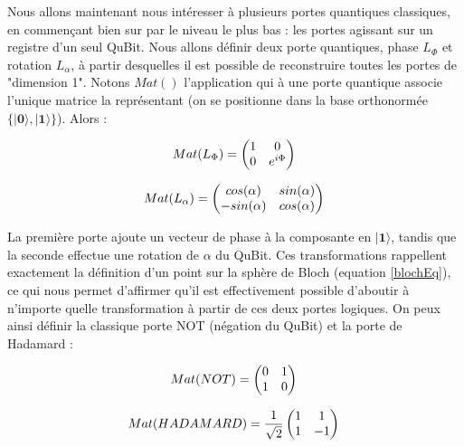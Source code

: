 \documentclass[a4paper,12pt]{report}
\newcommand{\quSt}[1]{\bm{|#1\rangle}}
\begin{document}
\par{
	Nous allons maintenant nous intéresser à plusieurs portes quantiques classiques, en commençant bien sur par le niveau le plus bas : les portes agissant sur un registre d'un seul QuBit. Nous allons définir deux porte quantiques, phase $L_{\Phi}$ et rotation $L_{\alpha}$, à partir desquelles il est possible de reconstruire toutes les portes de "dimension 1". Notons $Mat()$ l'application qui à une porte quantique associe l'unique matrice la représentant (on se positionne dans la base orthonormée $\{ \quSt{0}, \quSt{1} \}$). Alors :
}

\begin{equation}
	 Mat(L_{\Phi}) = \left( \begin{matrix} 1 & 0 \\ 0 & e^{i\Phi} \end{matrix} \right ) \\
\end{equation}

\begin{equation}
	 Mat(L_{\alpha}) = \left( \begin{matrix} cos(\alpha) & sin(\alpha) \\ -sin(\alpha) & cos(\alpha) \end{matrix} \right ) \\
\end{equation}

\vspace{1\baselineskip}

\par{
	La première porte ajoute un vecteur de phase à la composante en $\quSt{1}$, tandis que la seconde effectue une rotation de $\alpha$ du QuBit. Ces transformations rappellent exactement la définition d'un point sur la sphère de Bloch (equation \ref{blochEq}), ce qui nous permet d'affirmer qu'il est effectivement possible d'aboutir à n'importe quelle transformation à partir de ces deux portes logiques. On peux ainsi définir la classique porte NOT (négation du QuBit) et la porte de Hadamard :
}

\begin{equation}
	 Mat(NOT) = \left( \begin{matrix} 0 & 1 \\ 1 & 0 \end{matrix} \right ) \\
\end{equation}

\begin{equation}
	 Mat(HADAMARD) = \frac{1}{\sqrt{2}} \left( \begin{matrix} 1 & 1 \\ 1 & -1 \end{matrix} \right ) \\
\end{equation}
\end{document}
